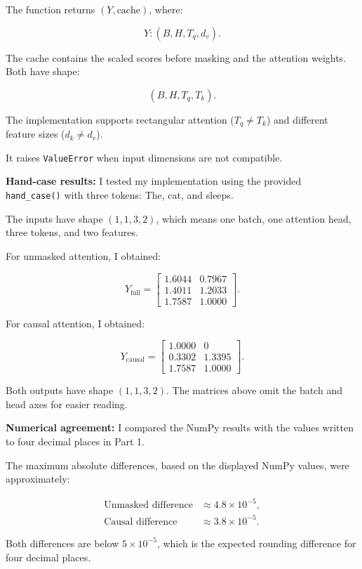 \documentclass[11pt]{article}
\begin{document}
The function returns $(Y,\mathrm{cache})$, where:

\[
Y:(B,H,T_q,d_v).
\]

The cache contains the scaled scores before masking
and the attention weights. Both have shape:

\[
(B,H,T_q,T_k).
\]

The implementation supports rectangular attention
($T_q \ne T_k$) and different feature sizes
($d_k \ne d_v$).

It raises \texttt{ValueError} when input dimensions
are not compatible.

\textbf{Hand-case results:} I tested my implementation using the provided
\texttt{hand\_case()} with three tokens:
The, cat, and sleeps.

The inputs have shape $(1,1,3,2)$, which means
one batch, one attention head, three tokens,
and two features.

For unmasked attention, I obtained:

\[
Y_{\mathrm{full}}=
\begin{bmatrix}
1.6044 & 0.7967\\
1.4011 & 1.2033\\
1.7587 & 1.0000
\end{bmatrix}.
\]

For causal attention, I obtained:

\[
Y_{\mathrm{causal}}=
\begin{bmatrix}
1.0000 & 0\\
0.3302 & 1.3395\\
1.7587 & 1.0000
\end{bmatrix}.
\]

Both outputs have shape $(1,1,3,2)$.
The matrices above omit the batch and head axes
for easier reading.

\textbf{Numerical agreement:} I compared the NumPy results with the values
written to four decimal places in Part 1.

The maximum absolute differences, based on
the displayed NumPy values, were approximately:

\[
\begin{aligned}
\text{Unmasked difference} &\approx 4.8\times10^{-5},\\
\text{Causal difference} &\approx 3.8\times10^{-5}.
\end{aligned}
\]

Both differences are below $5\times10^{-5}$,
which is the expected rounding difference
for four decimal places.
\end{document}
